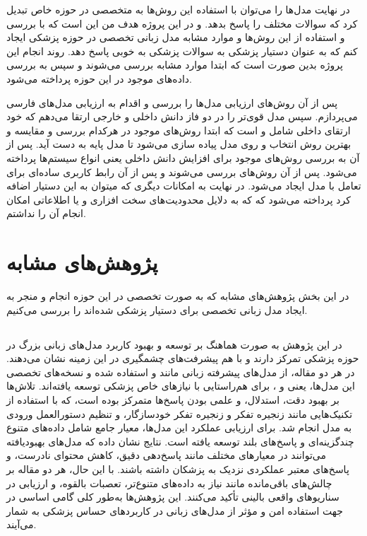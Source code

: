 \documentclass[11pt, a4paper, oneside]{book}
\begin{document}
			در نهایت مدل‌ها را می‌توان با استفاده این روش‌ها به متخصصی در حوزه خاص تبدیل کرد که سوالات مختلف را پاسخ بدهد. و در این پروژه هدف من این است که با بررسی و استفاده از این روش‌ها و موارد مشابه مدل زبانی تخصصی در حوزه پزشکی ایجاد کنم که به عنوان دستیار پزشکی به سوالات پزشکی به خوبی پاسخ دهد.
			روند انجام این پروژه بدین صورت است که ابتدا موارد مشابه بررسی می‌شوند و سپس به بررسی داده‌های موجود در این حوزه پرداخته می‌شود.
			
			پس از آن روش‌های ارزیابی مدل‌ها را بررسی و اقدام به ارزیابی مدل‌های فارسی می‌پردازم.
			سپس مدل قوی‌تر را در دو فاز دانش داخلی و خارجی ارتقا می‌دهم که خود ارتقای داخلی شامل  و  است که ابتدا روش‌های موجود در هرکدام بررسی و مقایسه و بهترین روش انتخاب و روی مدل پیاده سازی می‌شود تا مدل پایه به دست آید. پس از آن به بررسی روش‌های موجود برای افزایش دانش داخلی یعنی انواع  سیستم‌ها پرداخته می‌شود.
			پس از آن روش‌های  بررسی می‌شوند و پس از آن رابط کاربری ساده‌‌ای برای تعامل با مدل ایجاد می‌شود.
			در نهایت به امکانات دیگری که میتوان به این دستیار اضافه کرد پرداخته می‌شود که که به دلایل محدودیت‌های سخت افزاری و یا اطلاعاتی امکان انجام آن را نداشتم.
			
			
			
	\chapter{پژوهش‌های مشابه} \label{related_works}
	
		در این بخش پژوهش‌های مشابه که به صورت تخصصی در این حوزه انجام و منجر به ایجاد مدل زبانی تخصصی برای دستیار پزشکی شده‌اند را بررسی می‌کنیم.
	
		\section{}
			
			در این پژوهش به صورت هماهنگ بر توسعه و بهبود کاربرد مدل‌های زبانی بزرگ در حوزه پزشکی تمرکز دارند و با هم پیشرفت‌های چشمگیری در این زمینه نشان می‌دهند. در هر دو مقاله، از مدل‌های پیشرفته زبانی مانند  و استفاده شده و نسخه‌های تخصصی این مدل‌ها، یعنی  و ، برای هم‌راستایی با نیازهای خاص پزشکی توسعه یافته‌اند. تلاش‌ها بر بهبود دقت، استدلال، و علمی بودن پاسخ‌ها متمرکز بوده است، که با استفاده از تکنیک‌هایی مانند زنجیره تفکر و زنجیره تفکر خودسازگار، و تنظیم دستورالعمل ورودی به مدل انجام شد. برای ارزیابی عملکرد این مدل‌ها، معیار جامع  شامل داده‌های متنوع چندگزینه‌ای و پاسخ‌های بلند توسعه یافته است. نتایج نشان داده که مدل‌های بهبودیافته می‌توانند در معیارهای مختلف مانند پاسخ‌دهی دقیق، کاهش محتوای نادرست، و پاسخ‌های معتبر عملکردی نزدیک به پزشکان داشته باشند. با این حال، هر دو مقاله بر چالش‌های باقی‌مانده مانند نیاز به داده‌های متنوع‌تر، تعصبات بالقوه، و ارزیابی در سناریوهای واقعی بالینی تأکید می‌کنند. این پژوهش‌ها به‌طور کلی گامی اساسی در جهت استفاده امن و مؤثر از مدل‌های زبانی در کاربردهای حساس پزشکی به شمار می‌آیند. \cite{singhal_large_2022} \cite{singhal_towards_2023}
			
\end{document}
